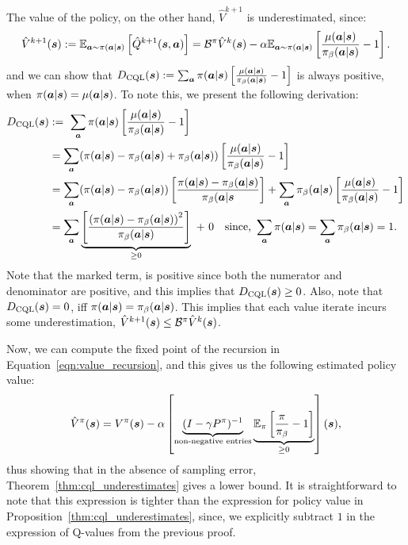 The value of the policy, on the other hand, $\hat{V}^{k+1}$ is underestimated, since:
\begin{equation}
    \hat{V}^{k+1}(\boldsymbol{s}) := \mathbb{E}_{\boldsymbol{a} \sim \pi(\boldsymbol{a}|\boldsymbol{s})} \left[ \hat{Q}^{k+1}(\boldsymbol{s}, \boldsymbol{a}) \right] = \mathcal{B}^\pi \hat{V}^k (\boldsymbol{s}) - \alpha \mathbb{E}_{\boldsymbol{a} \sim \pi(\boldsymbol{a}|\boldsymbol{s})}\left[\frac{\mu(\boldsymbol{a}|\boldsymbol{s})}{{\pi_\beta}(\boldsymbol{a}|\boldsymbol{s})} - 1 \right].
    \label{eqn:value_recursion}
\end{equation}
and we can show that $D_{\text{CQL}}(\boldsymbol{s}): = \sum_{\boldsymbol{a}} \pi(\boldsymbol{a}|\boldsymbol{s}) \left[\frac{\mu(\boldsymbol{a}|\boldsymbol{s})}{{\pi_\beta}(\boldsymbol{a}|\boldsymbol{s})} - 1 \right]$ is always positive, when $\pi(\boldsymbol{a}|\boldsymbol{s}) = \mu(\boldsymbol{a}|\boldsymbol{s})$. To note this, we present the following derivation:
\begin{align*}
    D_{\text{CQL}}(\boldsymbol{s}) &:=~ \sum_{\boldsymbol{a}} \pi(\boldsymbol{a}|\boldsymbol{s}) \left[\frac{\mu(\boldsymbol{a}|\boldsymbol{s})}{{\pi_\beta}(\boldsymbol{a}|\boldsymbol{s})} - 1 \right]\\
    &= \sum_{\boldsymbol{a}} (\pi(\boldsymbol{a}|\boldsymbol{s}) - {\pi_\beta}(\boldsymbol{a}|\boldsymbol{s}) + {\pi_\beta}(\boldsymbol{a}|\boldsymbol{s})) \left[\frac{\mu(\boldsymbol{a}|\boldsymbol{s})}{{\pi_\beta}(\boldsymbol{a}|\boldsymbol{s})} - 1 \right]\\
    &= \sum_{\boldsymbol{a}} (\pi(\boldsymbol{a}|\boldsymbol{s}) - {\pi_\beta}(\boldsymbol{a}|\boldsymbol{s})) \left[ \frac{\pi(\boldsymbol{a}|\boldsymbol{s}) - {\pi_\beta}(\boldsymbol{a}|\boldsymbol{s})}{{\pi_\beta}(\boldsymbol{a}|\boldsymbol{s}} \right] + \sum_{\boldsymbol{a}} {\pi_\beta}(\boldsymbol{a}|\boldsymbol{s}) \left[\frac{\mu(\boldsymbol{a}|\boldsymbol{s})}{{\pi_\beta}(\boldsymbol{a}|\boldsymbol{s})} - 1 \right]\\
    &= \sum_{\boldsymbol{a}} \underbrace{\left[ \frac{\left(\pi(\boldsymbol{a}|\boldsymbol{s}) - {\pi_\beta}(\boldsymbol{a}|\boldsymbol{s}) \right)^2}{{\pi_\beta}(\boldsymbol{a}|\boldsymbol{s})} \right]}_{\geq 0}~ +~ 0 \text{~~~since,~} \sum_{\boldsymbol{a}} \pi(\boldsymbol{a}|\boldsymbol{s}) = \sum_{\boldsymbol{a}} {\pi_\beta}(\boldsymbol{a}|\boldsymbol{s}) = 1.
\end{align*}
Note that the marked term, is positive since both the numerator and denominator are positive, and this implies that $D_\text{CQL}(\boldsymbol{s}) \geq 0$. Also, note that $D_\text{CQL}(\boldsymbol{s}) = 0$, iff $\pi(\boldsymbol{a}|\boldsymbol{s}) = {\pi_\beta}(\boldsymbol{a}|\boldsymbol{s})$. This implies that each value iterate incurs some underestimation, $\hat{V}^{k+1}(\boldsymbol{s}) \leq \mathcal{B}^\pi \hat{V}^k (\boldsymbol{s})$.

Now, we can compute the fixed point of the recursion in Equation~\ref{eqn:value_recursion}, and this gives us the following estimated policy value:
\begin{equation*}
    \hat{V}^\pi(\boldsymbol{s}) = V^\pi(\boldsymbol{s}) - \alpha \left[ \underbrace{(I - \gamma P^\pi)^{-1}}_{\text{non-negative entries}}
    \underbrace{\mathbb{E}_{\pi}\left[\frac{\pi}{{\pi_\beta}} - 1 \right]}_{\geq 0} \right](\boldsymbol{s}),
\end{equation*}
thus showing that in the absence of sampling error, Theorem~\ref{thm:cql_underestimates} gives a lower bound. It is straightforward to note that this expression is tighter than the expression for policy value in Proposition~\ref{thm:cql_underestimates}, since, we explicitly subtract $1$ in the expression of Q-values from the previous proof.

